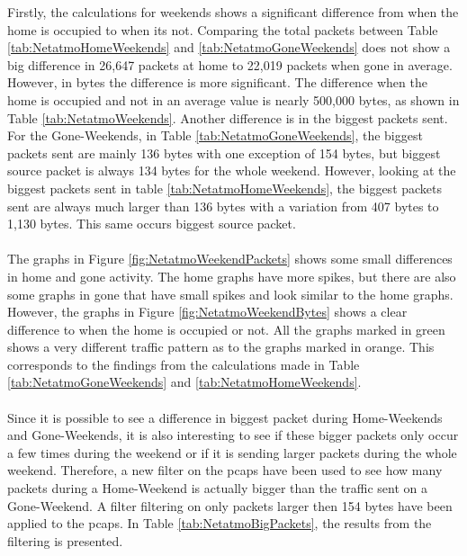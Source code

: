 Firstly, the calculations for weekends shows a significant difference from when the home is occupied to when its not. Comparing the total packets between Table \ref{tab:NetatmoHomeWeekends} and \ref{tab:NetatmoGoneWeekends} does not show a big difference in 26,647 packets at home to 22,019 packets when gone in average. However, in bytes the difference is more significant. The difference when the home is occupied and not in an average value is nearly 500,000 bytes, as shown in Table \ref{tab:NetatmoWeekends}. Another difference is in the biggest packets sent. For the Gone-Weekends, in Table \ref{tab:NetatmoGoneWeekends}, the biggest packets sent are mainly 136 bytes with one exception of 154 bytes, but biggest source packet is always 134 bytes for the whole weekend. However, looking at the biggest packets sent in table \ref{tab:NetatmoHomeWeekends}, the biggest packets sent are always much larger than 136 bytes with a variation from 407 bytes to 1,130 bytes. This same occurs biggest source packet.
\\\\
The graphs in Figure \ref{fig:NetatmoWeekendPackets} shows some small differences in home and gone activity. The home graphs have more spikes, but there are also some graphs in gone that have small spikes and look similar to the home graphs. However, the graphs in Figure \ref{fig:NetatmoWeekendBytes} shows a clear difference to when the home is occupied or not. All the graphs marked in green shows a very different traffic pattern as to the graphs marked in orange. This corresponds to the findings from the calculations made in Table \ref{tab:NetatmoGoneWeekends} and \ref{tab:NetatmoHomeWeekends}.
\\\\
Since it is possible to see a difference in biggest packet during Home-Weekends and Gone-Weekends, it is also interesting to see if these bigger packets only occur a few times during the weekend or if it is sending larger packets during the whole weekend. Therefore, a new filter on the pcaps have been used to see how many packets during a Home-Weekend is actually bigger than the traffic sent on a Gone-Weekend. A filter filtering on only packets larger then 154 bytes have been applied to the pcaps. In Table \ref{tab:NetatmoBigPackets}, the results from the filtering is presented. 

